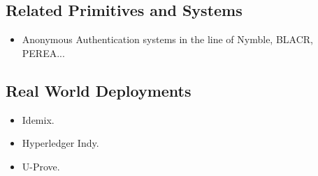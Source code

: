 \subsection{Related Primitives and Systems}
\label{ssec:acrelated}


\begin{itemize}
\item Anonymous Authentication systems in the line of Nymble, BLACR, PEREA...
\end{itemize}

\subsection{Real World Deployments}
\label{ssec:acrealworld}


\begin{itemize}
\item Idemix.
\item Hyperledger Indy.
\item U-Prove.
\end{itemize}

